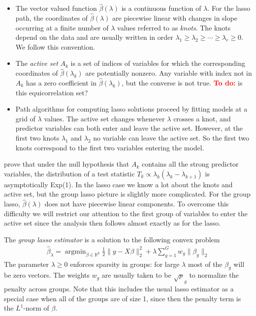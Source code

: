 \documentclass{imsart}
\newcommand{\argmin}{\mathop{\mathrm{argmin}}}
\newcommand{\todo}{\textcolor{red}{\textbf{To do: }}}
\newcommand{\real}{\mathbb{R}}
\begin{document}
\begin{itemize}

  \item The vector valued function $\hat \beta(\lambda)$ is a
    continuous function of $\lambda$. For the lasso path, the
    coordinates of $\hat \beta(\lambda)$ are piecewise linear with
    changes in slope occurring at a finite number of $\lambda$ values
    referred to as \emph{knots}. The knots depend on the data and are
    usually written in order $\lambda_1 \geq \lambda_2 \geq \cdots
    \geq \lambda_r \geq 0$. We follow this convention. 

  \item The \emph{active set} $A_k$ is a set of indices of variables
    for which the corresponding coordinates of $\hat \beta(\lambda_k)$
    are potentially nonzero. Any variable with index not in $A_k$ has
    a zero coefficient in $\hat \beta(\lambda_k)$, but the converse is
    not true. \todo{is this equicorrelation set?}
  
  \item Path algorithms for computing lasso solutions proceed by
    fitting models at a grid of $\lambda$ values. The active set
    changes whenever $\lambda$ crosses a knot, and predictor variables
    can both enter and leave the active set. However, at the first two
    knots $\lambda_1$ and $\lambda_2$ no variable can leave the active
    set. So the first two knots correspond to the first two variables
    entering the model. 

\end{itemize}

\cite{significance:lasso} prove that under the null hypothesis that $A_k$
contains all the strong predictor variables, the distribution of a
test statistic $T_k \propto \lambda_k(\lambda_k - \lambda_{k+1})$ is
asymptotically Exp(1). In the lasso case we know a lot about the knots
and active set, but the group lasso picture is slightly more
complicated. For the group lasso, $\hat \beta(\lambda)$ does not have
piecewise linear components. To overcome this difficulty we will
restrict our attention to the first group of variables to enter the
active set since the analysis then follows almost exactly as for the
lasso.

The \emph{group lasso estimator} is a solution to the following convex
problem
\begin{equation}
\begin{aligned}
\label{eq:gsoln}
\displaystyle \hat \beta_\lambda = \argmin_{\beta \in \real^p} \frac{1}{2} \| y - X \beta \|_2^2 +
   \lambda \sum_{g=1}^G w_g \| \beta_g \|_2
\end{aligned}
\end{equation}
The parameter $\lambda \geq 0$ enforces sparsity in groups: for large
$\lambda$ most of the $\beta_g$ will be zero vectors. The weights
$w_g$ are usually taken to be $\sqrt p_g$ to normalize the penalty
across groups.  Note that this includes the usual lasso estimator as a
special case when all of the groups are of size 1, since then the
penalty term is the $L^1$-norm of $\beta$. 
\end{document}
